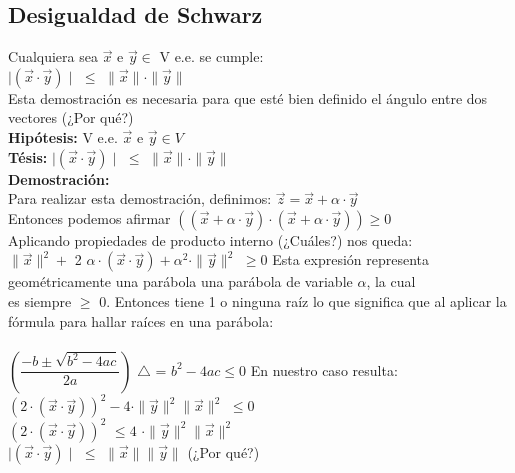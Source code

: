 \documentclass[11pt]{article}
\begin{document}
\subsection{Desigualdad de Schwarz}
Cualquiera sea $\vec{x}$ e $\vec{y} \in $ V e.e. se cumple: \\
$\mid(\vec{x}\cdot\vec{y})\mid$ $\leq$ $\parallel\vec{x}\parallel \cdot \parallel\vec{y}\parallel $ \\
Esta demostración es necesaria para que esté bien definido el ángulo entre dos vectores (¿Por qué?)\\
\textbf{Hipótesis:} V e.e. $\vec{x}$ e $\vec{y} \in V$ \\
\textbf{Tésis:} $\mid(\vec{x}\cdot\vec{y})\mid$ $\leq$ $\parallel\vec{x}\parallel \cdot \parallel\vec{y}\parallel $ \\
\textbf {Demostración:} \\
Para realizar esta demostración, definimos: $\vec{z} = \vec{x} + \alpha\cdot\vec{y}$ \\
Entonces podemos afirmar $((\vec{x} + \alpha\cdot\vec{y})\cdot(\vec{x} + \alpha\cdot\vec{y})) \geq 0$\\
Aplicando propiedades de producto interno (¿Cuáles?) nos queda: \\
$\parallel\vec{x}\parallel^2 +$ 2 $\alpha\cdot(\vec{x}\cdot\vec{y}) + \alpha^2 \cdot \parallel\vec{y}\parallel^2$ $\geq 0$
\newpage
\noindent Esta expresión representa geométricamente una parábola una parábola de variable $\alpha$, la cual \\ es siempre $\geq$ 0. Entonces tiene 1 o ninguna raíz lo que significa que al aplicar la fórmula para hallar raíces en una parábola:\\\\
$(\dfrac{-b\pm\sqrt{b^2-4ac}}{2a})$ \indent $\bigtriangleup$ = $b^2-4ac \leq 0$
\noindent En nuestro caso resulta: \\
$(2\cdot(\vec{x}\cdot\vec{y}))^2 -4 \cdot \parallel\vec{y}\parallel^2 \parallel\vec{x}\parallel^2$  $\leq 0$\\
$(2\cdot(\vec{x}\cdot\vec{y}))^2$ $\leq 4$ $\cdot \parallel\vec{y}\parallel^2 \parallel\vec{x}\parallel^2$ \\
$\mid(\vec{x}\cdot\vec{y})\mid$ $\leq$ $\parallel\vec{x}\parallel \parallel\vec{y}\parallel$ (¿Por qué?)
\end{document}
